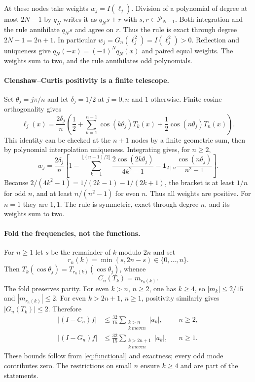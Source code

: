 \documentclass[11pt]{article}
\newcommand{\PP}{\mathcal P}
\theoremstyle{remark}\newtheorem{remark}[theorem]{Remark}
\begin{document}
At these nodes take weights $w_j=I(\ell_j)$. Division of a polynomial
of degree at most $2N-1$ by $q_N$ writes it as $q_Ns+r$ with
$s,r\in\PP_{N-1}$. Both integration and the rule annihilate $q_Ns$ and
agree on $r$. Thus the rule is exact through degree $2N-1=2n+1$.
In particular $w_j=G_n(\ell_j^2)=I(\ell_j^2)>0$. Reflection and uniqueness
give $q_N(-x)=(-1)^Nq_N(x)$ and paired equal weights. The weights sum
to two, and the rule annihilates odd polynomials.

\paragraph{Clenshaw--Curtis positivity is a finite telescope.}
Set $\theta_j=j\pi/n$ and let $\delta_j=1/2$ at $j=0,n$ and $1$
otherwise. Finite cosine orthogonality gives
\[
 \ell_j(x)=\frac{2\delta_j}{n}
 \left(\frac12+\sum_{k=1}^{n-1}\cos(k\theta_j)T_k(x)
                     +\frac12\cos(n\theta_j)T_n(x)\right).
\]
This identity can be checked at the $n+1$ nodes by a finite geometric
sum, then by polynomial interpolation uniqueness. Integrating gives,
for $n\ge2$,
\begin{equation}\label{eq:ccweights}
 w_j=\frac{2\delta_j}{n}\left[
 1-\sum_{k=1}^{\lfloor(n-1)/2\rfloor}\frac{2\cos(2k\theta_j)}{4k^2-1}
 -\boldsymbol1_{2\mid n}\frac{\cos(n\theta_j)}{n^2-1}\right].
\end{equation}
Because $2/(4k^2-1)=1/(2k-1)-1/(2k+1)$, the bracket is at least $1/n$
for odd $n$, and at least $n/(n^2-1)$ for even $n$. Thus all weights
are positive. For $n=1$ they are $1,1$. The rule is symmetric, exact
through degree $n$, and its weights sum to two.

\paragraph{Fold the frequencies, not the functions.}
For $n\ge1$ let $s$ be the remainder of $k$ modulo $2n$ and set
\[
 r_n(k)=\min(s,2n-s)\in\{0,\ldots,n\}.
\]
Then $T_k(\cos\theta_j)=T_{r_n(k)}(\cos\theta_j)$, whence
\begin{equation}\label{eq:fold}
 C_n(T_k)=m_{r_n(k)}.
\end{equation}
The fold preserves parity. For even $k>n$, $n\ge2$, one has $k\ge4$,
so $|m_k|\le2/15$ and $|m_{r_n(k)}|\le2$. For even $k>2n+1$,
$n\ge1$, positivity similarly gives $|G_n(T_k)|\le2$. Therefore
\begin{equation}\label{eq:master}
 \begin{aligned}
 |(I-C_n)f|&\le\frac{32}{15}\sum_{\substack{k>n\\k\ {
m even}}}|a_k|,
                      &&n\ge2,\\
 |(I-G_n)f|&\le\frac{32}{15}\sum_{\substack{k>2n+1\\k\ {
m even}}}|a_k|,
                      &&n\ge1.
 \end{aligned}
\end{equation}
These bounds follow from \eqref{eq:functional} and exactness; every odd
mode contributes zero. The restrictions on small $n$ ensure $k\ge4$ and
are part of the statements.
\end{document}
